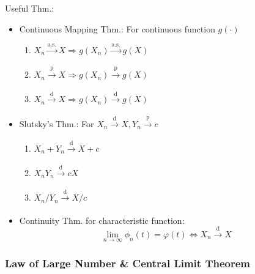         Useful Thm.:
        \begin{itemize}
            \item Continuous Mapping Thm.: For continuous function $g(\cdot)$\hypertarget{ContinuousMapping}{}
            \begin{enumerate}
                \item $X_n\xrightarrow[]{\text{a.s.}}X\Rightarrow g(X_n)\xrightarrow[]{\text{a.s.}}g(X)$
                \item $X_n\xrightarrow[]{\mathrm{p}}X\Rightarrow g(X_n)\xrightarrow[]{\mathrm{p} }g(X)$
                \item $X_n\xrightarrow[]{\mathrm{d}}X\Rightarrow g(X_n)\xrightarrow[]{\mathrm{d}}g(X)$
            \end{enumerate}
            \item Slutsky's Thm.: For $X_n\xrightarrow[]{\mathrm{d}}X,Y_n\xrightarrow[]{\mathrm{p}}c$
            \begin{enumerate}
                \item $X_n+Y_n\xrightarrow[]{\mathrm{d}}X+c$
                \item $X_nY_n\xrightarrow[]{\mathrm{d}}cX$
                \item $X_n/Y_n\xrightarrow[]{\mathrm{d}}X/c$
            \end{enumerate}
            \item Continuity Thm. for characteristic function:
            \begin{equation}        \lim_{n\to\infty}\phi_n(t)=\varphi(t)\Leftrightarrow X_n\xrightarrow[]{\mathrm{d}}X\end{equation}
        \end{itemize} 


\subsubsection{Law of Large Number \& Central Limit Theorem}

